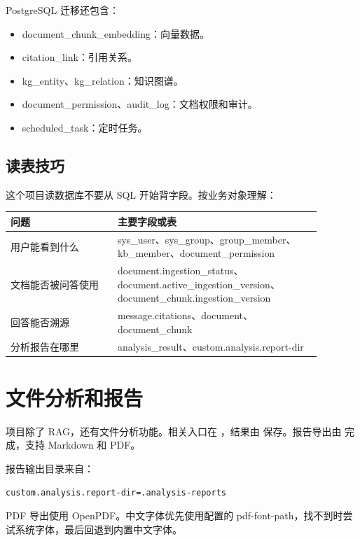 \documentclass[UTF8,zihao=-4]{ctexart}
\begin{document}
PostgreSQL 迁移还包含：

\begin{itemize}
  \item document\_chunk\_embedding：向量数据。
  \item citation\_link：引用关系。
  \item kg\_entity、kg\_relation：知识图谱。
  \item document\_permission、audit\_log：文档权限和审计。
  \item scheduled\_task：定时任务。
\end{itemize}

\subsection{读表技巧}

这个项目读数据库不要从 SQL 开始背字段。按业务对象理解：

\begin{longtable}{L{0.30\linewidth}L{0.58\linewidth}}
\toprule
问题 & 主要字段或表 \\
\midrule
用户能看到什么 & sys\_user、sys\_group、group\_member、kb\_member、document\_permission \\
文档能否被问答使用 & document.ingestion\_status、document.active\_ingestion\_version、document\_chunk.ingestion\_version \\
回答能否溯源 & message.citations、document、document\_chunk \\
分析报告在哪里 & analysis\_result、custom.analysis.report-dir \\
\bottomrule
\end{longtable}

\section{文件分析和报告}

项目除了 RAG，还有文件分析功能。相关入口在 ，结果由  保存。报告导出由  完成，支持 Markdown 和 PDF。

报告输出目录来自：

\begin{lstlisting}[style=code]
custom.analysis.report-dir=.analysis-reports
\end{lstlisting}

PDF 导出使用 OpenPDF。中文字体优先使用配置的 pdf-font-path，找不到时尝试系统字体，最后回退到内置中文字体。
\end{document}

